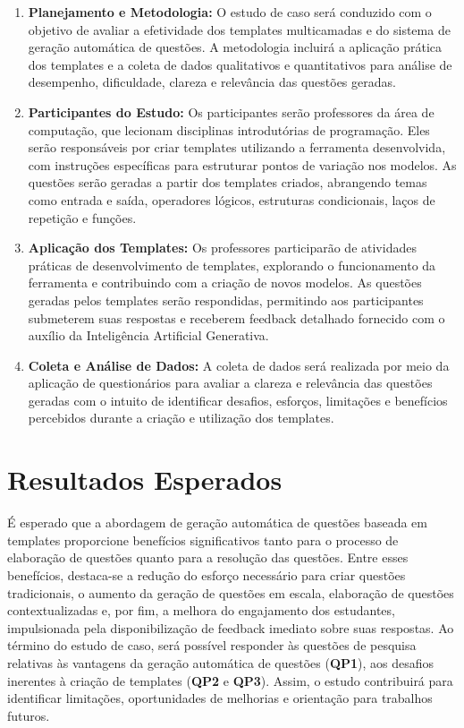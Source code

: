 \begin{enumerate}[label=\textbf{\alph*)}]
    \item \textbf{Planejamento e Metodologia:}  
    O estudo de caso será conduzido com o objetivo de avaliar a efetividade dos templates multicamadas e do sistema de geração automática de questões. A metodologia incluirá a aplicação prática dos templates e a coleta de dados qualitativos e quantitativos para análise de desempenho, dificuldade, clareza e relevância das questões geradas. 

    \item \textbf{Participantes do Estudo:}  
    Os participantes serão professores da área de computação, que lecionam disciplinas introdutórias de programação. Eles serão responsáveis por criar templates utilizando a ferramenta desenvolvida, com instruções específicas para estruturar pontos de variação nos modelos. As questões serão geradas a partir dos templates criados, abrangendo temas como entrada e saída, operadores lógicos, estruturas condicionais, laços de repetição e funções.

    \item \textbf{Aplicação dos Templates:}  
    Os professores participarão de atividades práticas de desenvolvimento de templates, explorando o funcionamento da ferramenta e contribuindo com a criação de novos modelos. As questões geradas pelos templates serão respondidas, permitindo aos participantes submeterem suas respostas e receberem feedback detalhado fornecido com o auxílio da Inteligência Artificial Generativa.

    \item \textbf{Coleta e Análise de Dados:}  A coleta de dados será realizada por meio da aplicação de questionários para avaliar a clareza e relevância das questões geradas com o intuito de identificar desafios, esforços, limitações e benefícios percebidos durante a criação e utilização dos templates. 
\end{enumerate}
    


\section{Resultados Esperados}

É esperado que a abordagem de geração automática de questões baseada em templates  proporcione benefícios significativos tanto para o processo de elaboração de questões quanto para a resolução das questões. Entre esses benefícios,  destaca-se a redução do esforço necessário para criar questões tradicionais, o aumento da geração de questões em escala, elaboração de questões contextualizadas e, por fim, a melhora do engajamento dos estudantes, impulsionada pela disponibilização de feedback imediato sobre suas respostas. Ao término do estudo de caso, será possível responder às questões de pesquisa relativas às vantagens da geração automática de questões (\textbf{QP1}), aos desafios inerentes à criação de templates (\textbf{QP2} e \textbf{QP3}). Assim, o estudo contribuirá para identificar limitações, oportunidades de melhorias e orientação para trabalhos futuros.